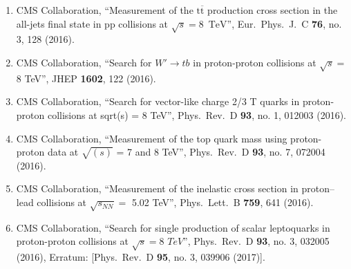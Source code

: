 \begin{itemize}
\begin{enumerate}
\item CMS Collaboration, ``Measurement of the $\mathrm{t}\overline{{\mathrm{t}}}$ production cross section in the all-jets final state in pp collisions at $\sqrt{s}=8$ $\,\text {TeV}$'', Eur.\ Phys.\ J.\ C {\bf 76}, no. 3, 128 (2016).

\item CMS Collaboration, ``Search for $W' \to tb$ in proton-proton collisions at $\sqrt{s} = $ 8 TeV'', JHEP {\bf 1602}, 122 (2016).

\item CMS Collaboration, ``Search for vector-like charge 2/3 T quarks in proton-proton collisions at sqrt(s) = 8 TeV'', Phys.\ Rev.\ D {\bf 93}, no. 1, 012003 (2016).

\item CMS Collaboration, ``Measurement of the top quark mass using proton-proton data at ${\sqrt{(s)}}$ = 7 and 8 TeV'', Phys.\ Rev.\ D {\bf 93}, no. 7, 072004 (2016).

\item CMS Collaboration, ``Measurement of the inelastic cross section in proton–lead collisions at $\sqrt {s_{NN}}=$ 5.02 TeV'', Phys.\ Lett.\ B {\bf 759}, 641 (2016).

\item CMS Collaboration, ``Search for single production of scalar leptoquarks in proton-proton collisions at $\sqrt{s} = 8$ $TeV$'', Phys.\ Rev.\ D {\bf 93}, no. 3, 032005 (2016), Erratum: [Phys.\ Rev.\ D {\bf 95}, no. 3, 039906 (2017)].


\end{enumerate}
\end{itemize}
